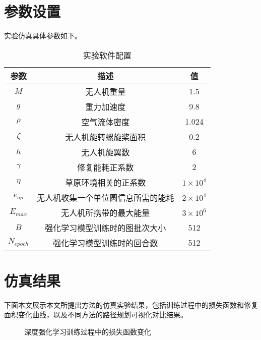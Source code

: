 \documentclass[AutoFakeBold]{LZUThesis}
\begin{document}
\section{参数设置}
实验仿真具体参数如下。

\label{sub:无人机参数表格}
\begin{table}[H]
	\centering
	\caption{实验软件配置}
	\setlength{\tabcolsep}{18pt} %
	\begin{tabular}{ccc} %
		\toprule
		参数              & 描述                & 值                   \\
		\midrule
		\( M \)         & 无人机重量             & 1.5                 \\
		\( g \)         & 重力加速度             & 9.8                 \\
		\( \rho \)      & 空气流体密度            & 1.024               \\
		\( \zeta \)     & 无人机旋转螺旋桨面积        & 0.2                 \\
		\( h \)         & 无人机旋翼数            & 6                   \\
		\( \gamma \)    & 修复能耗正系数           & 2                   \\
		\( \eta \)      & 草原环境相关的正系数        & \( 1 \times 10^4 \) \\
		\( e_{ap} \)    & 无人机收集一个单位圆信息所需的能耗 & \( 2 \times 10^4 \) \\
		\( E_{max} \)   & 无人机所携带的最大能量       & \( 3 \times 10^6 \) \\
		\( B \)         & 强化学习模型训练时的图批次大小   & 512                 \\
		\( N_{epoch} \) & 强化学习模型训练时的回合数     & 512                 \\
		\bottomrule
	\end{tabular}
	\label{tbl_drone_parameters}
\end{table}

\section{仿真结果}


下面本文展示本文所提出方法的仿真实验结果，包括训练过程中的损失函数和修复面积变化曲线，以及不同方法的路径规划可视化对比结果。

\begin{figure}[H]
	\centering
	
	\caption{深度强化学习训练过程中的损失函数变化}
	\label{fig:training_loss_curve}
\end{figure}
\end{document}
